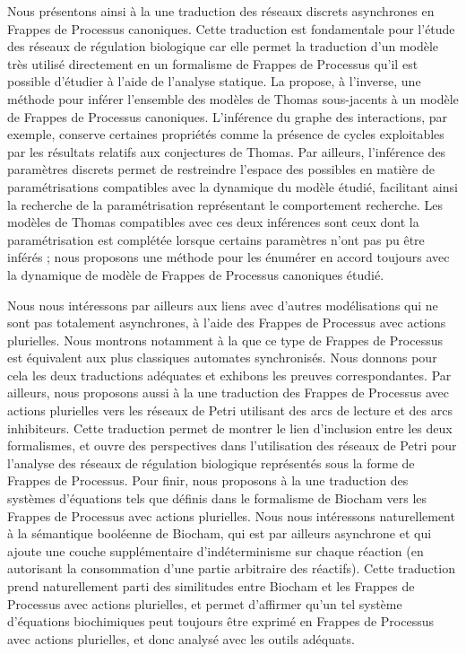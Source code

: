 Nous présentons ainsi à la  une traduction des réseaux discrets asynchrones
en Frappes de Processus canoniques.
Cette traduction est fondamentale pour l'étude des réseaux de régulation biologique
car elle permet la traduction d'un modèle très utilisé directement en un formalisme
de Frappes de Processus qu'il est possible d'étudier à l'aide de l'analyse statique.
La  propose, à l'inverse, une méthode pour inférer l'ensemble des modèles
de Thomas sous-jacents à un modèle de Frappes de Processus canoniques.
L'inférence du graphe des interactions, par exemple,
conserve certaines propriétés comme la présence de cycles
exploitables par les résultats relatifs aux conjectures de Thomas.
Par ailleurs, l'inférence des paramètres discrets permet de restreindre l'espace des possibles
en matière de paramétrisations compatibles avec la dynamique du modèle étudié,
facilitant ainsi la recherche de la paramétrisation représentant le comportement recherche.
Les modèles de Thomas compatibles avec ces deux inférences sont ceux dont la paramétrisation
est complétée lorsque certains paramètres n'ont pas pu être inférés ;
nous proposons une méthode pour les énumérer en accord toujours avec la dynamique
de modèle de Frappes de Processus canoniques étudié.

Nous nous intéressons par ailleurs aux liens avec d'autres modélisations
qui ne sont pas totalement asynchrones,
à l'aide des Frappes de Processus avec actions plurielles.
Nous montrons notamment à la  que ce type de Frappes de Processus
est équivalent aux plus classiques automates synchronisés.
Nous donnons pour cela les deux traductions adéquates et exhibons les preuves correspondantes.
Par ailleurs, nous proposons aussi à la 
une traduction des Frappes de Processus avec actions
plurielles vers les réseaux de Petri utilisant des arcs de lecture et des arcs inhibiteurs.
Cette traduction permet de montrer le lien d'inclusion entre les deux formalismes,
et ouvre des perspectives dans l'utilisation des réseaux de Petri pour l'analyse des réseaux
de régulation biologique représentés sous la forme de Frappes de Processus.
Pour finir, nous proposons à la  une traduction des systèmes d'équations tels
que définis dans le formalisme de Biocham vers les Frappes de Processus avec actions plurielles.
Nous nous intéressons naturellement à la sémantique booléenne de Biocham,
qui est par ailleurs asynchrone et qui ajoute une couche supplémentaire d'indéterminisme
sur chaque réaction (en autorisant la consommation d'une partie arbitraire des réactifs).
Cette traduction prend naturellement parti des similitudes entre Biocham et les Frappes
de Processus avec actions plurielles, et permet d'affirmer
qu'un tel système d'équations biochimiques peut toujours être exprimé
en Frappes de Processus avec actions plurielles,
et donc analysé avec les outils adéquats.



